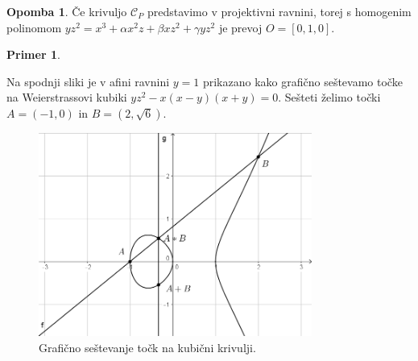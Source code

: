 \documentclass[12pt,a4paper,twoside]{article}
\theoremstyle{definition} %
\newtheorem{primer}[definicija]{Primer}
\newtheorem{opomba}[definicija]{Opomba}
\theoremstyle{plain} %
\numberwithin{equation}{section}  %
\begin{document}
\begin{opomba}
Če krivuljo $\mathcal{C}_P$ predstavimo v projektivni ravnini, torej s homogenim polinomom $yz^2=x^3+\alpha x^2z+\beta xz^2+ \gamma yz^2$ je prevoj $O=[0,1,0].$
\end{opomba}

\begin{primer}~

Na spodnji sliki je v afini ravnini $y=1$ prikazano kako grafično seštevamo točke na Weierstrassovi kubiki $yz^2-x(x-y)(x+y)=0$. Sešteti želimo točki $A =(-1,0)$ in $B=(2,\sqrt{6}) $.
\\


\begin{figure}[h]
  \centering
  \includegraphics[width=0.8\textwidth]{images/adicija.png}
  \caption[Grafično seštevanje.]{Grafično seštevanje točk na kubični krivulji.}
  \label{fig:adicija}
\end{figure}

\end{primer}
\end{document}
